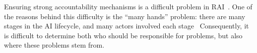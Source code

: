

Ensuring strong accountability mechanisms is a difficult problem in RAI~\cite{cooper2022accountability, schiff2020principles}.
One of the reasons behind this difficulty is the ``many hands'' problem: there are many stages in the AI lifecycle, and many actors involved each stage~\cite{cooper2022accountability, nissenbaum1996accountability}
Consequently, it is difficult to determine both who should be responsible for problems, but also where these problems stem from.


